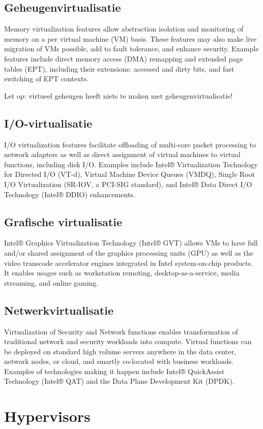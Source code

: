 \subsection{Geheugenvirtualisatie}

Memory virtualization features allow abstraction isolation and monitoring of memory on a per virtual machine (VM) basis. These features may also make live migration of VMs possible, add to fault tolerance, and enhance security. Example features include direct memory access (DMA) remapping and extended page tables (EPT), including their extensions: accessed and dirty bits, and fast switching of EPT contexts.

Let op: virtueel geheugen heeft niets te maken met geheugenvirtualisatie!

\subsection{I/O-virtualisatie}

I/O virtualization features facilitate offloading of multi-core packet processing to network adapters as well as direct assignment of virtual machines to virtual functions, including disk I/O. Examples include Intel® Virtualization Technology for Directed I/O (VT-d), Virtual Machine Device Queues (VMDQ), Single Root I/O Virtualization (SR-IOV, a PCI-SIG standard), and Intel® Data Direct I/O Technology (Intel® DDIO) enhancements.


\subsection{Grafische virtualisatie}

Intel® Graphics Virtualization Technology (Intel® GVT) allows VMs to have full and/or shared assignment of the graphics processing units (GPU) as well as the video transcode accelerator engines integrated in Intel system-on-chip products. It enables usages such as workstation remoting, desktop-as-a-service, media streaming, and online gaming.

\subsection{Netwerkvirtualisatie}

Virtualization of Security and Network functions enables transformation of traditional network and security workloads into compute. Virtual functions can be deployed on standard high volume servers anywhere in the data center, network nodes, or cloud, and smartly co-located with business workloads. Examples of technologies making it happen include Intel® QuickAssist Technology (Intel® QAT) and the Data Plane Development Kit (DPDK).

\section{Hypervisors}


